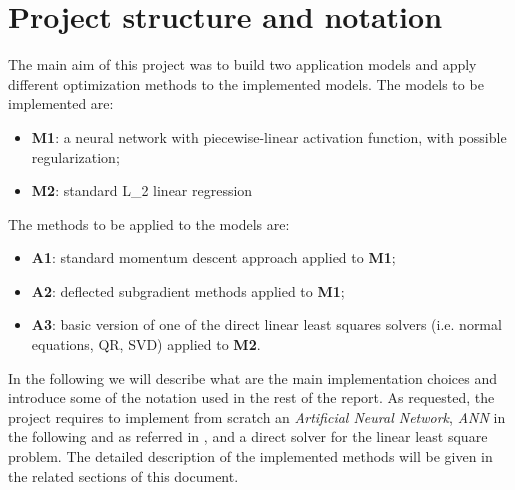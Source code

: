 \section{Project structure and notation}
The main aim of this project was to build two application models and apply different optimization methods to the implemented models.\newline
The models to be implemented are:
\begin{itemize}
    \item \textbf{M1}: a neural network with piecewise-linear activation function, with possible regularization;
    \item \textbf{M2}: standard L\_2 linear regression
\end{itemize}
The methods to be applied to the models are:
\begin{itemize}
    \item \textbf{A1}: standard momentum descent approach applied to \textbf{M1};
    \item \textbf{A2}: deflected subgradient methods applied to \textbf{M1};
    \item \textbf{A3}: basic version of one of the direct linear least squares solvers (i.e. normal equations, QR, SVD) applied to \textbf{M2}.
\end{itemize}
In the following we will describe what are the main implementation choices and introduce some of the notation used in the rest of the report.\newline
As requested, the project requires to implement from scratch an \textit{Artificial Neural Network}, \textit{ANN} in the following and as referred in \cite{MLmitchell}, and a direct solver for the linear least square problem. The detailed description of the implemented methods will be given in the related sections of this document.